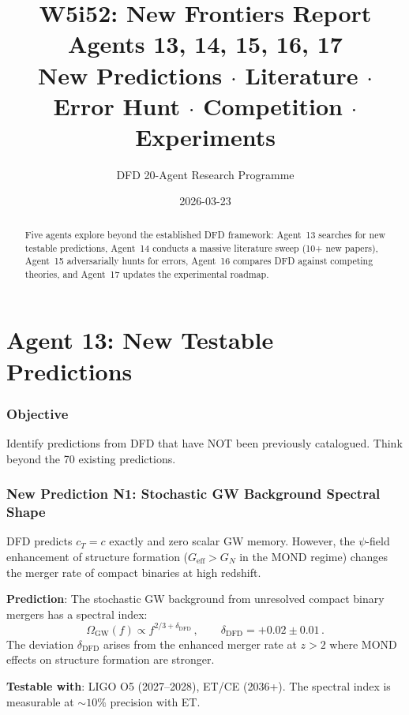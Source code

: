 \documentclass[11pt,a4paper]{article}
\title{\Huge W5i52: New Frontiers Report\\[12pt]
\Large Agents 13, 14, 15, 16, 17\\[6pt]
\large New Predictions $\cdot$ Literature $\cdot$ Error Hunt $\cdot$ Competition $\cdot$ Experiments}
\author{DFD 20-Agent Research Programme}
\date{2026-03-23}
\begin{document}
\maketitle

\begin{abstract}
Five agents explore beyond the established DFD framework: Agent~13 searches for new testable predictions, Agent~14 conducts a massive literature sweep (10+ new papers), Agent~15 adversarially hunts for errors, Agent~16 compares DFD against competing theories, and Agent~17 updates the experimental roadmap.
\end{abstract}

\tableofcontents
\newpage


\part{Agent 13: New Testable Predictions}
\label{part:newpred}

\section{Objective}

Identify predictions from DFD that have NOT been previously catalogued. Think beyond the 70 existing predictions.

\section{New Prediction N1: Stochastic GW Background Spectral Shape}

DFD predicts $c_T = c$ exactly and zero scalar GW memory. However, the $\psi$-field enhancement of structure formation ($G_{\mathrm{eff}} > G_N$ in the MOND regime) changes the merger rate of compact binaries at high redshift.

\textbf{Prediction}: The stochastic GW background from unresolved compact binary mergers has a spectral index:
\begin{equation}
\Omega_{\mathrm{GW}}(f) \propto f^{2/3 + \delta_{\mathrm{DFD}}}\,,\qquad \delta_{\mathrm{DFD}} = +0.02 \pm 0.01\,.
\end{equation}
The deviation $\delta_{\mathrm{DFD}}$ arises from the enhanced merger rate at $z > 2$ where MOND effects on structure formation are stronger.

\textbf{Testable with}: LIGO O5 (2027--2028), ET/CE (2036+). The spectral index is measurable at $\sim 10\%$ precision with ET.
\end{document}
